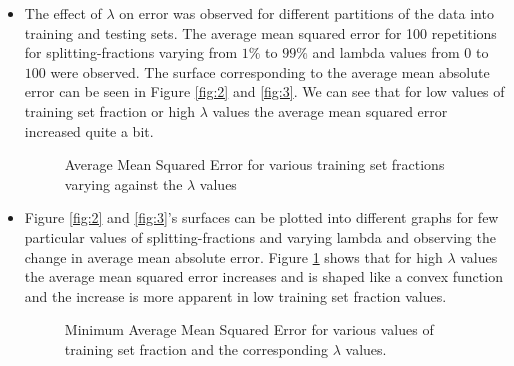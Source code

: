 \documentclass{article}
\begin{document}
\begin{itemize}
\item The effect of $\lambda$ on error was observed for different partitions of the data into training and testing sets. The average mean squared error for 100 repetitions for splitting-fractions varying from $1\%$ to $99\%$ and lambda values from $0$ to $100$ were observed. The surface corresponding to the average mean absolute error can be seen in Figure \ref{fig:2} and \ref{fig:3}. We can see that for low values of training set fraction or high $\lambda$ values the average mean squared error increased quite a bit.
 
 \begin{figure}[H]
 \caption{Average Mean Squared Error for various training set fractions varying against the $\lambda$ values}
 \label{fig:4}
 \end{figure}
 
\item Figure \ref{fig:2} and \ref{fig:3}'s surfaces can be plotted into different graphs for few particular values of splitting-fractions and varying lambda and observing the change in average mean absolute error. Figure \ref{fig:4} shows that for high $\lambda$ values the average mean squared error increases and is shaped like a convex function and the increase is more apparent in low training set fraction values.

\begin{figure}[H]
 \caption{Minimum Average Mean Squared Error for various values of training set fraction and the corresponding $\lambda$ values.}
 \label{fig:5}
 \end{figure}


\end{itemize}
\end{document}
